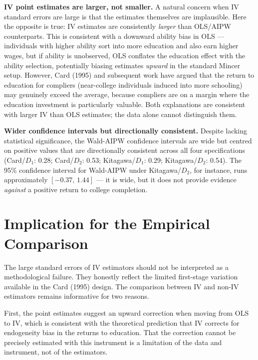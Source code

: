 \documentclass[12pt,a4paper]{article}
\begin{document}
\medskip\noindent\textbf{IV point estimates are larger, not smaller.}
A natural concern when IV standard errors are large is that the estimates themselves are
implausible.  Here the opposite is true: IV estimates are consistently \emph{larger}
than OLS/AIPW counterparts.  This is consistent with a downward ability bias in OLS ---
individuals with higher ability sort into more education and also earn higher wages, but
if ability is unobserved, OLS conflates the education effect with the ability selection,
potentially biasing estimates \emph{upward} in the standard Mincer setup.  However, Card
(1995) and subsequent work have argued that the return to education for compliers
(near-college individuals induced into more schooling) may genuinely exceed the average,
because compliers are on a margin where the education investment is particularly valuable.
Both explanations are consistent with larger IV than OLS estimates; the data alone cannot
distinguish them.

\medskip\noindent\textbf{Wider confidence intervals but directionally consistent.}
Despite lacking statistical significance, the Wald-AIPW confidence intervals are wide
but centred on positive values that are directionally consistent across all four
specifications (Card/$D_1$: 0.28; Card/$D_2$: 0.53; Kitagawa/$D_1$: 0.29;
Kitagawa/$D_2$: 0.54).  The 95\% confidence interval for Wald-AIPW under
Kitagawa/$D_2$, for instance, runs approximately $[-0.37,\, 1.44]$ --- it is wide, but
it does not provide evidence \emph{against} a positive return to college completion.

\section{Implication for the Empirical Comparison}

The large standard errors of IV estimators should not be interpreted as a methodological
failure.  They honestly reflect the limited first-stage variation available in the
Card (1995) design.  The comparison between IV and non-IV estimators remains
informative for two reasons.

First, the point estimates suggest an upward correction when moving from OLS to IV,
which is consistent with the theoretical prediction that IV corrects for endogeneity
bias in the returns to education.  That the correction cannot be precisely estimated
with this instrument is a limitation of the data and instrument, not of the estimators.
\end{document}
